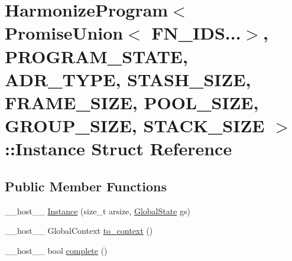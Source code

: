 \hypertarget{structHarmonizeProgram_3_01PromiseUnion_3_01FN__IDS_8_8_8_4_00	PROGRAM__STATE_00	ADR__TYPE_00	ST4715b6d9483ec93aa205e44f9547d2b8}{\section{Harmonize\-Program$<$ Promise\-Union$<$ F\-N\-\_\-\-I\-D\-S...$>$, P\-R\-O\-G\-R\-A\-M\-\_\-\-S\-T\-A\-T\-E, A\-D\-R\-\_\-\-T\-Y\-P\-E, S\-T\-A\-S\-H\-\_\-\-S\-I\-Z\-E, F\-R\-A\-M\-E\-\_\-\-S\-I\-Z\-E, P\-O\-O\-L\-\_\-\-S\-I\-Z\-E, G\-R\-O\-U\-P\-\_\-\-S\-I\-Z\-E, S\-T\-A\-C\-K\-\_\-\-S\-I\-Z\-E $>$\-:\-:Instance Struct Reference}
\label{structHarmonizeProgram_3_01PromiseUnion_3_01FN__IDS_8_8_8_4_00	PROGRAM__STATE_00	ADR__TYPE_00	ST4715b6d9483ec93aa205e44f9547d2b8}
}
\subsection*{Public Member Functions}
\begin{DoxyCompactItemize}
\item 
\-\_\-\-\_\-host\-\_\-\-\_\- \hyperlink{structHarmonizeProgram_3_01PromiseUnion_3_01FN__IDS_8_8_8_4_00	PROGRAM__STATE_00	ADR__TYPE_00	ST4715b6d9483ec93aa205e44f9547d2b8_a03dde40791c67871c79db925f6ab8e8e}{Instance} (size\-\_\-t arsize, \hyperlink{structHarmonizeProgram_3_01PromiseUnion_3_01FN__IDS_8_8_8_4_00	PROGRAM__STATE_00	ADR__TYPE_00	ST96305cc1a177b714bc64a5044f46c97c_ad7d9f7be9e75c070fe6b85be51f6d053}{Global\-State} gs)
\item 
\-\_\-\-\_\-host\-\_\-\-\_\- Global\-Context \hyperlink{structHarmonizeProgram_3_01PromiseUnion_3_01FN__IDS_8_8_8_4_00	PROGRAM__STATE_00	ADR__TYPE_00	ST4715b6d9483ec93aa205e44f9547d2b8_a5332b3b21d22a377258ffdf6e3949514}{to\-\_\-context} ()
\item 
\-\_\-\-\_\-host\-\_\-\-\_\- bool \hyperlink{structHarmonizeProgram_3_01PromiseUnion_3_01FN__IDS_8_8_8_4_00	PROGRAM__STATE_00	ADR__TYPE_00	ST4715b6d9483ec93aa205e44f9547d2b8_a65c988887ef2f67cb1b8d783b2c7e8c2}{complete} ()
\end{DoxyCompactItemize}
